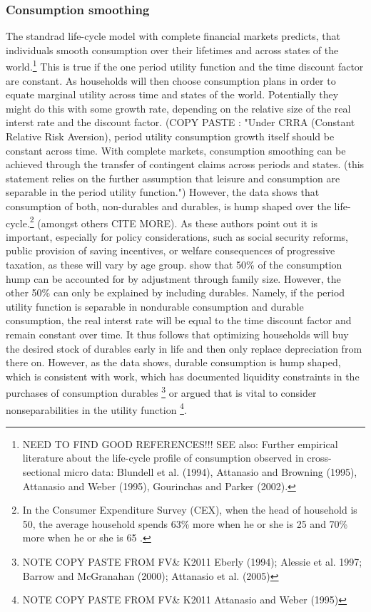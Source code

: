 \documentclass[a4paper,12pt]{article}
\begin{document}
\subsubsection{Consumption smoothing}
The standrad life-cycle model with complete financial markets predicts, that individuals smooth consumption over their lifetimes and across states of the world.\footnote{NEED TO FIND GOOD REFERENCES!!! SEE also: Further empirical literature about the life-cycle profile of consumption observed in cross-sectional micro data: Blundell et al. (1994), Attanasio and Browning (1995), Attanasio and Weber (1995), Gourinchas and Parker (2002).  } This is true if the one period utility function and the time discount factor are constant. As  households will then choose consumption plans in order to equate marginal utility across time and states of the world. Potentially they might do this with some growth rate, depending on the relative size of the real interst rate and the discount factor. (COPY PASTE \citep{FV&K2011}: "Under CRRA (Constant Relative Risk Aversion), period utility consumption growth itself should be constant across time. With complete markets, consumption smoothing can be achieved through the transfer of contingent claims across periods and states. (this statement relies on the further assumption that leisure and consumption are separable in the period utility function.") However, the data shows that consumption of both, non-durables and durables, is hump shaped over the life-cycle.\footnote{In the Consumer Expenditure Survey (CEX), when the head of household is 50, the average household spends 63\% more when he or she is 25 and 70\% more when he or she is 65 \citep{FV&K2011}.} (amongst others CITE MORE). As these authors point out it is important, especially for policy considerations, such as social security reforms, public provision of saving incentives, or welfare consequences of progressive taxation, as these will vary by age group. \cite{FV&K2011} show that 50\% of the consumption hump can be accounted for by adjustment through family size. However, the other 50\% can only be explained by including durables. Namely, if the period utility function is separable in nondurable consumption and durable consumption, the real interst rate will be equal to the time discount factor and remain constant over time. It thus follows that optimizing households will buy the desired stock of durables early in life and then only replace depreciation from there on. However, as the data shows, durable consumption is hump shaped, which is consistent with work, which has documented liquidity constraints in the purchases of consumption durables \footnote{NOTE COPY PASTE FROM FV\& K2011 Eberly (1994); Alessie et al. 1997; Barrow and McGranahan (2000); Attanasio et al. (2005)} or argued that is vital to consider nonseparabilities in the utility function \footnote{NOTE COPY PASTE FROM FV\& K2011 Attanasio and Weber (1995)}.
\end{document}
